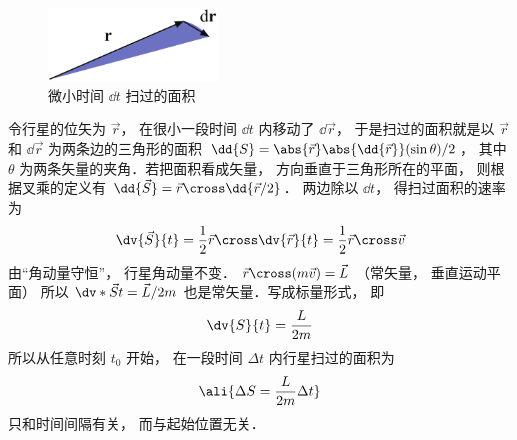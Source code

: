 
\begin{figure}[ht]
\centering
\includegraphics[width=4.5cm]{./figures/Keple21.pdf}
\caption{微小时间 $\dd{t}$ 扫过的面积} \label{Keple21}
\end{figure}

令行星的位矢为 $\vec r$，  在很小一段时间 $\dd{t}$ 内移动了 $\dd{\vec r}$，  于是扫过的面积就是以 $\vec r$ 和 $\dd{\vec r}$ 为两条边的三角形的面积 $\dd{S} = \abs{\vec r} \abs{\dd{\vec r}} (\sin \theta) /2 $，  其中 $\theta$ 为两条矢量的夹角．若把面积看成矢量， 方向垂直于三角形所在的平面， 则根据叉乘的定义有 $\dd{\vec S} = \vec r \cross \dd{\vec r/2}$． 两边除以 $\dd{t}$，  得扫过面积的速率为
\begin{equation}
\dv{\vec S}{t} = \frac12 \vec r \cross \dv{\vec r}{t} = \frac12 \vec r\cross \vec v
\end{equation}
由“角动量守恒”， 行星角动量不变．
$\vec r \cross (m\vec v) = \vec L$ （常矢量， 垂直运动平面） 所以 $\dv*{\vec S}{t} = \vec L /2m$ 也是常矢量．写成标量形式， 即
\begin{equation}
\dv{S}{t} = \frac{L}{2m}
\end{equation}
所以从任意时刻 $t_0$ 开始， 在一段时间 $\Delta t$ 内行星扫过的面积为 
\begin{equation}\ali{
\Delta S = \frac{L}{2m}\Delta t
}\end{equation}
只和时间间隔有关， 而与起始位置无关．

